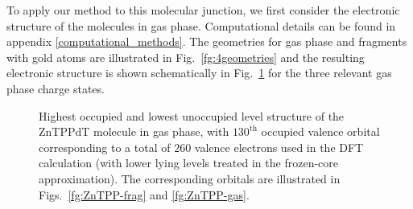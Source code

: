 \documentclass[aip,jcp,a4paper,reprint,floatfix,superscriptaddress]{revtex4-1}
\begin{document}
To apply our method to this molecular junction, we first 
consider the electronic structure of the molecules in gas phase. 
Computational details can be found in appendix \ref{computational_methods}. The geometries for gas phase and fragments with gold atoms are illustrated in Fig.~\ref{fg:4geometries} and the resulting electronic structure is shown schematically in Fig.~\ref{fg:ZnTPP-levels} for the three relevant gas phase charge states.


\begin{figure}
\caption{Highest occupied and lowest unoccupied level structure of the ZnTPPdT molecule in gas phase, with $130^\text{th}$ occupied valence orbital corresponding to a total of $260$ valence electrons used in the DFT calculation (with lower lying levels treated in the frozen-core approximation). The corresponding orbitals are illustrated in Figs.~\ref{fg:ZnTPP-frag} and \ref{fg:ZnTPP-gas}.}\label{fg:ZnTPP-levels}
\end{figure}
\end{document}
